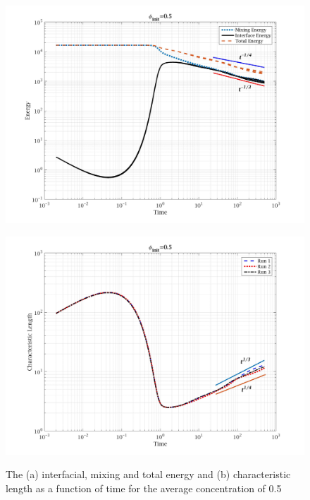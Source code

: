 \documentclass[a4paper,6pt]{article}
\begin{document}
\begin{figure}[H]
        \begin{minipage}[b]{.5\linewidth}        
                \centering
                \includegraphics[width=1\textwidth]{pics/E_c2.jpg}
                \subcaption{}
				\label{E_c2}
        \end{minipage}
        \begin{minipage}[b]{.5\linewidth}
                \centering
                \includegraphics[width=1\textwidth]{pics/L_c2.jpg}
                \subcaption{}
                	\label{L_c2}
        \end{minipage}
                \caption{The (a) interfacial, mixing and total energy and (b) characteristic length as a function of time for the average concentration of 0.5}
        \label{EL_c2}
\end{figure}
\end{document}
